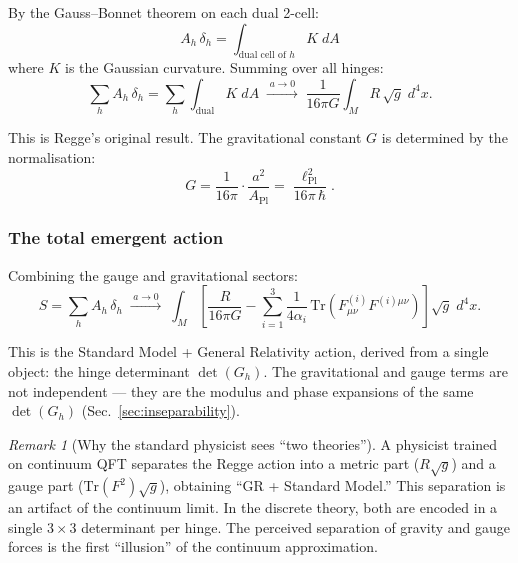 \documentclass[12pt]{article}
\theoremstyle{remark}
\newtheorem{remark}[theorem]{Remark}
\theoremstyle{definition}
\begin{document}
By the Gauss--Bonnet theorem on each dual 2-cell:
\begin{equation}
A_h\,\delta_h = \int_{\text{dual cell of }h} K\;dA
\end{equation}
where $K$ is the Gaussian curvature.  Summing over all hinges:
\begin{equation}
\sum_h A_h\,\delta_h = \sum_h\int_{\text{dual}} K\;dA \;\xrightarrow{\;a \to 0\;}\; \frac{1}{16\pi G}\int_M R\,\sqrt{g}\;d^4x.
\end{equation}

This is Regge's original result.  The gravitational constant $G$ is determined by the normalisation:
\begin{equation}
G = \frac{1}{16\pi}\cdot\frac{a^2}{A_\text{Pl}} = \frac{\ell_\text{Pl}^2}{16\pi\,\hbar}.
\end{equation}

\subsubsection{The total emergent action}

Combining the gauge and gravitational sectors:
\begin{equation}
\boxed{S = \sum_h A_h\,\delta_h \;\xrightarrow{\;a \to 0\;}\; \int_M\!\left[\frac{R}{16\pi G} - \sum_{i=1}^{3}\frac{1}{4\alpha_i}\,\text{Tr}(F^{(i)}_{\mu\nu}F^{(i)\mu\nu})\right]\sqrt{g}\;d^4x.}
\end{equation}

This is the Standard Model + General Relativity action, derived from a single object: the hinge determinant $\det(G_h)$.  The gravitational and gauge terms are not independent --- they are the modulus and phase expansions of the same $\det(G_h)$ (Sec.~\ref{sec:inseparability}).

\begin{remark}[Why the standard physicist sees ``two theories'']
A physicist trained on continuum QFT separates the Regge action into a metric part ($R\sqrt{g}$) and a gauge part ($\text{Tr}(F^2)\sqrt{g}$), obtaining ``GR + Standard Model.''  This separation is an artifact of the continuum limit.  In the discrete theory, both are encoded in a single $3 \times 3$ determinant per hinge.  The perceived separation of gravity and gauge forces is the first ``illusion'' of the continuum approximation.
\end{remark}

\end{document}
